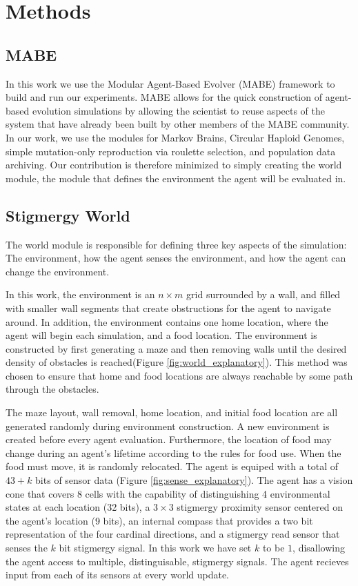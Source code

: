 \section{Methods}

\subsection{MABE}

In this work we use the Modular Agent-Based Evolver\cite{MABE}  (MABE) framework to build and run our experiments. MABE allows for the quick construction of agent-based evolution simulations by allowing the scientist to reuse aspects of the system that have already been built by other members of the MABE community. In our work, we use the modules for Markov Brains, Circular Haploid Genomes, simple mutation-only reproduction via roulette selection, and population data archiving. Our contribution is therefore minimized to simply creating the world module, the module that defines the environment the agent will be evaluated in.

\subsection{Stigmergy World}

The world module is responsible for defining three key aspects of the simulation: The environment, how the agent senses the environment, and how the agent can change the environment.

In this work, the environment is an $n\times m$ grid surrounded by a wall, and filled with smaller wall segments that create obstructions for the agent to navigate around. In addition, the environment contains one home location, where the agent will begin each simulation, and a food location. The environment is constructed by first generating a maze and then removing walls until the desired density of obstacles is reached(Figure \ref{fig:world_explanatory}). This method was chosen to ensure that home and food locations are always reachable by some path through the obstacles.



The maze layout, wall removal, home location, and initial food location are all generated randomly during environment construction. A new environment is created before every agent evaluation. Furthermore, the location of food may change during an agent's lifetime according to the rules for food use. When the food must move, it is randomly relocated.
The agent is equiped with a total of $43+k$ bits of sensor data (Figure \ref{fig:sense_explanatory}). The agent has a vision cone that covers 8 cells with the capability of distinguishing 4 environmental states at each location (32 bits), a $3\times 3$ stigmergy proximity sensor centered on the agent's location (9 bits), an internal compass that provides a two bit representation of the four cardinal directions, and a stigmergy read sensor that senses  the $k$ bit stigmergy signal. In this work we have set $k$ to be $1$, disallowing the agent access to multiple, distinguisable, stigmergy signals. The agent recieves input from each of its sensors at every world update.

